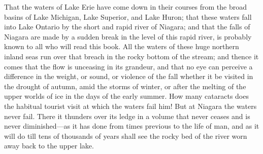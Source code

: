 That the waters of Lake Erie have come down in their courses from
the broad basins of Lake Michigan, Lake Superior, and Lake Huron;
that these waters fall into Lake Ontario by the short and rapid
river of Niagara; and that the falls of Niagara are made by a
sudden break in the level of this rapid river, is probably known to
all who will read this book.  All the waters of these huge northern
inland seas run over that breach in the rocky bottom of the stream;
and thence it comes that the flow is unceasing in its grandeur, and
that no eye can perceive a difference in the weight, or sound, or
violence of the fall whether it be visited in the drought of
autumn, amid the storms of winter, or after the melting of the
upper worlds of ice in the days of the early summer.  How many
cataracts does the habitual tourist visit at which the waters fail
him!  But at Niagara the waters never fail.  There it thunders over
its ledge in a volume that never ceases and is never diminished---as
it has done from times previous to the life of man, and as it will
do till tens of thousands of years shall see the rocky bed of the
river worn away back to the upper lake.

